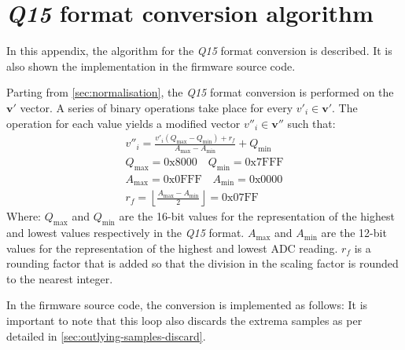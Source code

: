 \chapter{\textit{Q15} format conversion algorithm} \label{app:q15}

In this appendix, the algorithm for the \textit{Q15} format \cite{ARMQ15} conversion is described. It is also shown the implementation in the firmware source code.

Parting from \cref{sec:normalisation}, the \textit{Q15} format conversion is performed on the $\mathbf{v'}$ vector. A series of binary operations take place for every $v'_i \in \mathbf{v'}$. The operation for each value yields a modified vector $v''_i \in \mathbf{v''}$ such that:
\begin{gather}
	v''_i = \frac{v'_i(Q_{\max}-Q_{\min})+r_f}{A_{\max}-A_{\min}} + Q_{\min}\\
	Q_{\max} = \mathrm{0x8000}\quad Q_{\min} = \mathrm{0x7FFF} \\
	A_{\max} = \mathrm{0x0FFF}\quad A_{\min} = \mathrm{0x0000} \\
	r_f = \left\lfloor \frac{A_{\max}-A_{\min}}{2} \right\rfloor = \mathrm{0x07FF}
\end{gather}
Where: $Q_{\max}$ and $Q_{\min}$ are the 16-bit values for the representation of the highest and lowest values respectively in the \textit{Q15} format. $A_{\max}$ and $A_{\min}$ are the 12-bit values for the representation of the highest and lowest ADC reading. $r_f$ is a rounding factor that is added so that the division in the scaling factor is rounded to the nearest integer.

In the firmware source code, the conversion is implemented as follows:
It is important to note that this loop also discards the extrema samples as per detailed in \cref{sec:outlying-samples-discard}.

